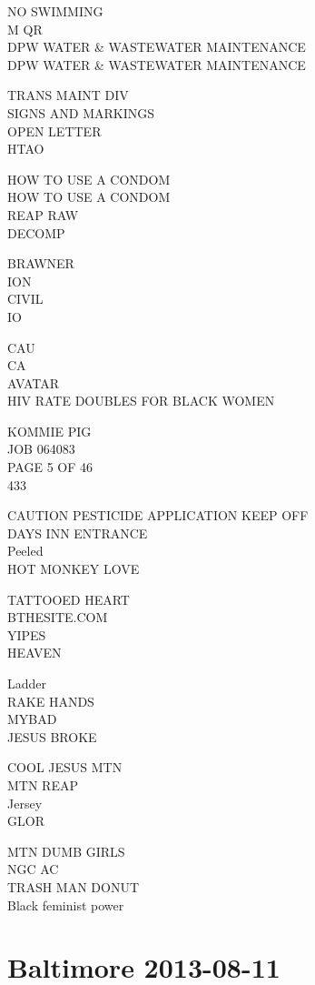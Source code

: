 \documentclass[10pt,letterpaper]{article}
\begin{document}
NO SWIMMING\\
M QR\\
DPW WATER \& WASTEWATER MAINTENANCE\\
DPW WATER \& WASTEWATER MAINTENANCE

TRANS MAINT DIV\\
SIGNS AND MARKINGS\\
OPEN LETTER\\
HTAO

HOW TO USE A CONDOM\\
HOW TO USE A CONDOM\\
REAP RAW\\
DECOMP

BRAWNER\\
ION\\
CIVIL\\
IO

CAU\\
CA\\
AVATAR\\
HIV RATE DOUBLES FOR BLACK WOMEN

KOMMIE PIG\\
JOB 064083\\
PAGE 5 OF 46\\
433

CAUTION PESTICIDE APPLICATION KEEP OFF\\
DAYS INN ENTRANCE\\
Peeled\\
HOT MONKEY LOVE

TATTOOED HEART\\
BTHESITE.COM\\
YIPES\\
HEAVEN

Ladder\\
RAKE HANDS\\
MYBAD\\
JESUS BROKE

COOL JESUS MTN\\
MTN REAP\\
Jersey\\
GLOR

MTN DUMB GIRLS\\
NGC AC\\
TRASH MAN DONUT\\
Black feminist power


\section*{Baltimore 2013-08-11}
\end{document}
